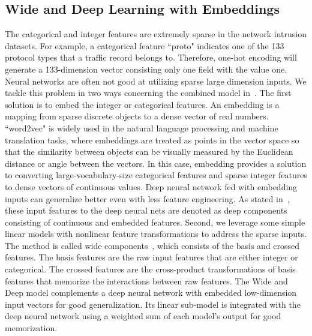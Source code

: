 \subsection{Wide and Deep Learning with Embeddings}
\label{SubSec:WD}
The categorical and integer features are extremely sparse in the network intrusion datasets.
For example, a categorical feature ``proto" indicates one of the 133 protocol types that a traffic record belongs to. Therefore, one-hot encoding will generate a 133-dimension vector consisting only one field with the value one. Neural networks are often not good at utilizing sparse large dimension inputs.
We tackle this problem in two ways concerning the combined model in~\cite{WideDeepModel}.
The first solution is to embed the integer or categorical features.
An embedding is a mapping from sparse discrete objects to a dense vector of real numbers.
``word2vec" is widely used in the natural language processing and machine translation tasks, where embeddings are treated as points in the vector space so that the similarity between objects can be visually measured
by the Euclidean distance or angle between the vectors.
In this case, embedding provides a solution to converting large-vocabulary-size categorical features and sparse integer features to dense vectors of continuous values.
Deep neural network fed with embedding inputs can generalize better even with less feature engineering.
As stated in~\cite{WideDeepModel}, these input features to the deep neural nets are denoted as deep components consisting of continuous and embedded features.
Second, we leverage some simple linear models with nonlinear feature transformations to address the sparse inputs. The method is called wide components~\cite{WideDeepModel}, which consists of the basis and crossed features.
The basis features are the raw input features that are either integer or categorical.
The crossed features are the cross-product transformations of basis features that memorize the interactions between raw features.
The Wide and Deep model complements a deep neural network
with embedded low-dimension input vectors for good generalization.
Its linear sub-model is integrated with the deep neural network using a weighted sum of each model's output for good memorization.

